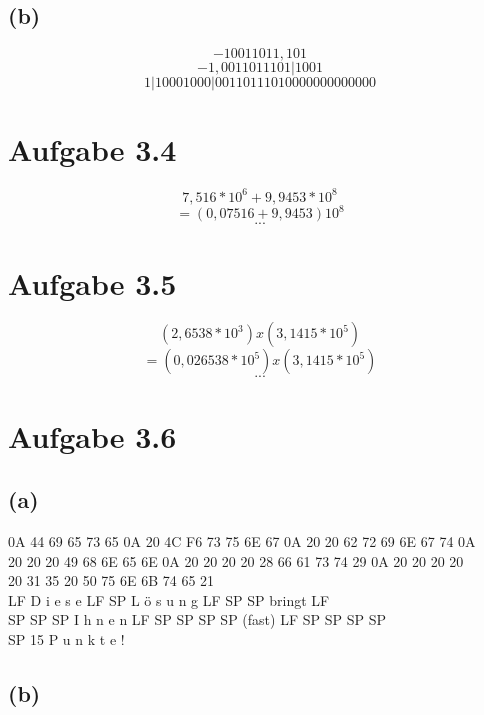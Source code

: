 \documentclass[12pt]{article}
\begin{document}
\subsection{(b)}
\[-10011011,101\]
\[-1,0011011101 | 1001\]
\[1 | 10001000 | 00110111010000000000000\]

\section{Aufgabe 3.4}
\[7,516 * 10^6 + 9,9453 * 10^8\]
\[= (0,07516 + 9,9453) 10^8\]
\[...\]

\section{Aufgabe 3.5}
\[(2,6538 * 10^3) x (3,1415 * 10^5)\]
\[= (0,026538 * 10^5) x (3,1415 * 10^5)\]
\[...\]

\section{Aufgabe 3.6}
\subsection{(a)}
0A 44 69 65 73 65 0A 20 4C F6 73 75 6E 67 0A 20 20 62 72 69 6E 67 74 0A \\
20 20 20 49 68 6E 65 6E 0A 20 20 20 20 28 66 61 73 74 29 0A 20 20 20 20 \\
20 31 35 20 50 75 6E 6B 74 65 21 \\
LF D i e s e LF SP  L ö s u n g LF SP SP bringt LF \\
SP SP SP I h n e n LF SP SP SP SP (fast) LF SP SP SP SP \\
SP 15   P u n k t e !
\subsection{(b)}
\end{document}
